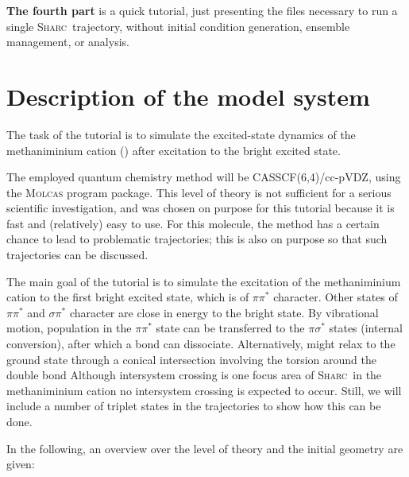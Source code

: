 \documentclass[a4paper,11pt,DIV=15,openany]{scrbook}
\newcommand{\sharc}{\textsc{Sharc}}
\begin{document}
\textbf{The fourth part} is a quick tutorial, just presenting the files necessary to run a single \sharc\ trajectory, without initial condition generation, ensemble management, or analysis.



\section{Description of the model system}
\label{sec:model_system}

The task of the tutorial is to simulate the excited-state dynamics of the methaniminium cation () after excitation to the bright excited state.

The employed quantum chemistry method will be CASSCF(6,4)/cc-pVDZ, using the \textsc{Molcas} program package. 
This level of theory is not sufficient for a serious scientific investigation, and was chosen on purpose for this tutorial because it is fast and (relatively) easy to use.
For this molecule, the method has a certain chance to lead to problematic trajectories; this is also on purpose so that such trajectories can be discussed.

The main goal of the tutorial is to simulate the excitation of the methaniminium cation to the first bright excited state, which is of $\pi\pi^*$ character.
Other states of $\pi\pi^*$ and $\sigma\pi^*$ character are close in energy to the bright state. 
By vibrational motion, population in the $\pi\pi^*$ state can be transferred to the $\pi\sigma^*$ states (internal conversion), after which a bond can dissociate.
Alternatively,  might relax to the ground state through a conical intersection involving the torsion around the double bond
Although intersystem crossing is one focus area of \sharc\, in the methaniminium cation no intersystem crossing is expected to occur. Still, we will include a number of triplet states in the trajectories to show how this can be done.

In the following, an overview over the level of theory and the initial geometry are given:
\end{document}
